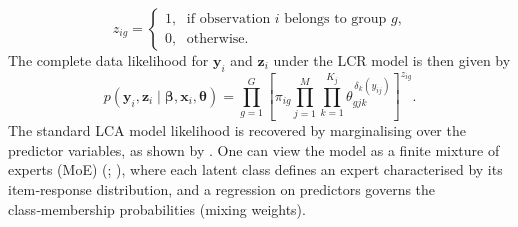 \documentclass[11pt]{article}
\def\boldx{\mathbf{x}}
\def\boldy{\mathbf{y}}
\def\boldz{\mathbf{z}}
\def\bsbet{\boldsymbol{\beta}}
\def\bsthet{\boldsymbol{\theta}}
\theoremstyle{plain}
\theoremstyle{definition}
\begin{document}
\[
z_{ig} = \begin{cases}
    1,\; \text{ if observation $i$ belongs to group $g$,}\\
    0,\; \text{ otherwise.}
\end{cases}
\]
The complete data likelihood for $\boldy_i$ and $\boldz_i$ under the LCR model is then given by
\begin{equation}\label{LCR_complete_like}
p(\boldy_i, \boldz_i \mid \bsbet, \boldx_i, \bsthet) = \prod_{g=1}^G \left[ \pi_{ig} \prod_{j=1}^M \prod_{k=1}^{K_j} \theta_{gjk}^{\,\delta_k(y_{ij})} \right]^{z_{ig}}.%
\end{equation}
The standard LCA model likelihood is recovered by marginalising over the predictor variables, as shown by \citet{bandeen-roche_latent_1997}. One can view the model as a finite mixture of experts (MoE) (\citet{jacobs_adaptive_1991}; \citet{gormley_mixture_2019}), where each latent class defines an expert characterised by its item‑response distribution, and a regression on predictors governs the class‑membership probabilities (mixing weights).
\end{document}
